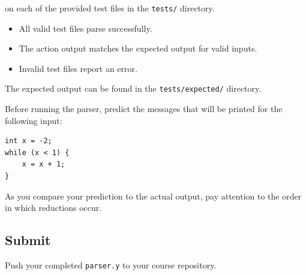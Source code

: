 \documentclass[12pt]{article}
\newcommand{\checkbox}{\item[$\square$]}
\begin{document}
on each of the provided test files in the \texttt{tests/} directory.

\begin{itemize}
    \checkbox All valid test files parse successfully.
    \checkbox The action output matches the expected output for valid inputs.
    \checkbox Invalid test files report an error.
\end{itemize}

The expected output can be found in the \texttt{tests/expected/} directory.

Before running the parser, predict the messages that will be printed for the following input:

\begin{lstlisting}
int x = -2;
while (x < 1) {
    x = x + 1;
}
\end{lstlisting}

As you compare your prediction to the actual output, pay attention to the order in which reductions occur.

\subsection*{Submit}

Push your completed \texttt{parser.y} to your course repository.
\end{document}
